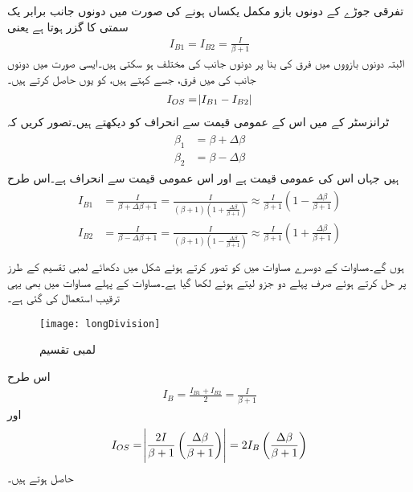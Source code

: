 تفرقی جوڑے کے دونوں بازو مکمل یکساں ہونے کی صورت میں دونوں جانب برابر یک سمتی  کا گزر ہوتا ہے یعنی
\begin{align}
I_{B1}=I_{B2}=\frac{I}{\beta+1}
\end{align}
البتہ دونوں بازووں میں فرق کی بنا پر دونوں جانب کی  مختلف ہو سکتی ہیں۔ایسی صورت میں دونوں جانب کی  میں فرق، جسے      کہتے ہیں، کو یوں حاصل کرتے ہیں۔
\begin{align}
I_{OS}=\abs{I_{B1}-I_{B2}}
\end{align}
ٹرانزسٹر کے   میں اس کے عمومی قیمت سے انحراف کو دیکھتے ہیں۔تصور کریں کہ
\begin{gather}
\begin{aligned}
\beta_1 &=\beta+\Delta \beta \\
\beta_2 &=\beta - \Delta \beta
\end{aligned}
\end{gather}
 ہیں جہاں  اس کی عمومی قیمت ہے اور  اس عمومی قیمت سے انحراف ہے۔اس طرح
\begin{gather}
\begin{aligned}\label{مساوات_تفرقی_افزائش_لمبی_تقسیم_الف}
I_{B1}&=\frac{I}{\beta+\Delta \beta +1}=\frac{I}{\left(\beta+1 \right ) \left(1+\frac{\Delta \beta}{\beta+1} \right )} \approx \frac{I}{\beta+1} \left (1-\frac{\Delta \beta}{\beta+1} \right )\\
I_{B2}&=\frac{I}{\beta - \Delta \beta +1}=\frac{I}{\left(\beta+1 \right ) \left(1 - \frac{\Delta \beta}{\beta+1} \right )} \approx \frac{I}{\beta+1} \left (1+ \frac{\Delta \beta}{\beta+1} \right )\\
\end{aligned}
\end{gather}
ہوں گے۔مساوات  کے دوسرے مساوات میں  کو  تصور کرتے ہوئے شکل  میں دکھائے لمبی تقسیم کے طرز  پر حل کرتے ہوئے  صرف پہلے دو جزو لیتے ہوئے  لکھا گیا ہے۔مساوات  کے پہلے مساوات میں بھی یہی ترقیب استعمال کی گئی ہے۔
\begin{figure}
\centering
\texttt{[image: longDivision]}
\caption{لمبی تقسیم}
\label{شکل_لمبی_تقسیم}
\end{figure}
اس طرح
\begin{align}
I_B=\frac{I_{B1}+I_{B2}}{2}=\frac{I}{\beta+1}
\end{align}
اور
\begin{align}
I_{OS}=\abs{\frac{2 I}{\beta+1} \left(\frac{\Delta \beta}{\beta+1} \right )}=2 I_B \left(\frac{\Delta \beta}{\beta+1} \right )
\end{align}
حاصل ہوتے ہیں۔

